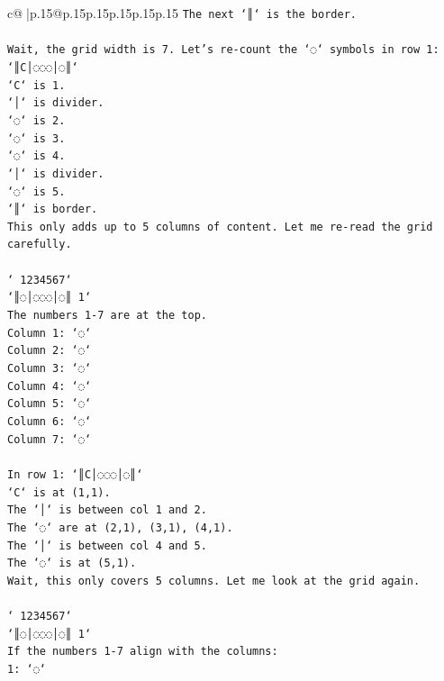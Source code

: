 \documentclass{article}
\begin{document}
{\begin{supertabular}{c@{$\;$}|p{.15\linewidth}@{}p{.15\linewidth}p{.15\linewidth}p{.15\linewidth}p{.15\linewidth}p{.15\linewidth}}
{{{\texttt{The next `║` is the border.} \\
\\ 
\texttt{Wait, the grid width is 7. Let's re{-}count the `◌` symbols in row 1:} \\
\texttt{`║C│◌◌◌│◌║`} \\
\texttt{`C` is 1.} \\
\texttt{`│` is divider.} \\
\texttt{`◌` is 2.} \\
\texttt{`◌` is 3.} \\
\texttt{`◌` is 4.} \\
\texttt{`│` is divider.} \\
\texttt{`◌` is 5.} \\
\texttt{`║` is border.} \\
\texttt{This only adds up to 5 columns of content. Let me re{-}read the grid carefully.} \\
\\ 
\texttt{` 1234567`} \\
\texttt{`║◌│◌◌◌│◌║ 1`} \\
\texttt{The numbers 1{-}7 are at the top.} \\
\texttt{Column 1: `◌`} \\
\texttt{Column 2: `◌`} \\
\texttt{Column 3: `◌`} \\
\texttt{Column 4: `◌`} \\
\texttt{Column 5: `◌`} \\
\texttt{Column 6: `◌`} \\
\texttt{Column 7: `◌`} \\
\\ 
\texttt{In row 1: `║C│◌◌◌│◌║`} \\
\texttt{`C` is at (1,1).} \\
\texttt{The `│` is between col 1 and 2.} \\
\texttt{The `◌` are at (2,1), (3,1), (4,1).} \\
\texttt{The `│` is between col 4 and 5.} \\
\texttt{The `◌` is at (5,1).} \\
\texttt{Wait, this only covers 5 columns. Let me look at the grid again.} \\
\\ 
\texttt{` 1234567`} \\
\texttt{`║◌│◌◌◌│◌║ 1`} \\
\texttt{If the numbers 1{-}7 align with the columns:} \\
\texttt{1: `◌`} \\
}}}
\end{supertabular}}
\end{document}
